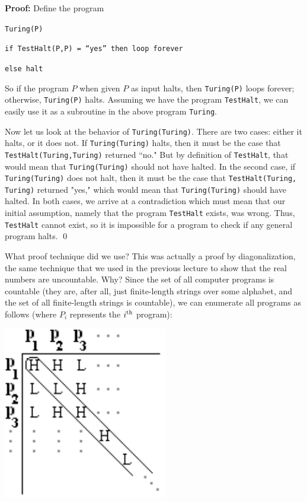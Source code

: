 \documentclass[11pt,fleqn]{article}
\begin{document}
\textbf{Proof:} Define the program

\hspace{.5in} \texttt{Turing(P)}

\hspace{.7in} \texttt{if TestHalt(P,P) = ``yes'' then loop forever}

\hspace{.7in} \texttt{else halt}
\vspace{.1cm}

\noindent So if the program $P$ when given $P$ as input halts, then \texttt{Turing(P)} loops forever;
otherwise, \texttt{Turing(P)} halts.  Assuming we have the program \texttt{TestHalt}, we can easily use
it as a subroutine in the above program \texttt{Turing}.

Now let us look at the behavior of \texttt{Turing(Turing)}. There are two cases: either it halts, 
or it does not.  If \texttt{Turing(Turing)} halts, then it must be the case that 
\texttt{TestHalt(Turing,Turing)} returned ``no."
But by definition of \texttt{TestHalt}, that would mean that \texttt{Turing(Turing)} should not have halted. In the second case, if
\texttt{Turing(Turing)} does not halt, then it must be the case that \texttt{TestHalt(Turing, Turing)}
returned "yes," which would mean that \texttt{Turing(Turing)} should have halted. 
In both cases, we arrive at a contradiction
which must mean that our initial assumption, namely that the program \texttt{TestHalt} exists, 
was wrong.  Thus, \texttt{TestHalt} cannot exist, so it is impossible for a program to check 
if any general program halts.
\qed

\vspace{.1in}

What proof technique did we use? This was actually a proof by diagonalization, the same technique that we used in the previous lecture to show that the real numbers are uncountable. Why? Since 
the set of all computer programs is countable (they are, after all, just finite-length
strings over some alphabet, and the set of all finite-length strings is countable), we can
enumerate all programs as follows (where $P_i$ represents the $i^{\rm th}$ program):


\includegraphics[bb = -40 0 0 100, scale=0.7]{halt3}
\end{document}
